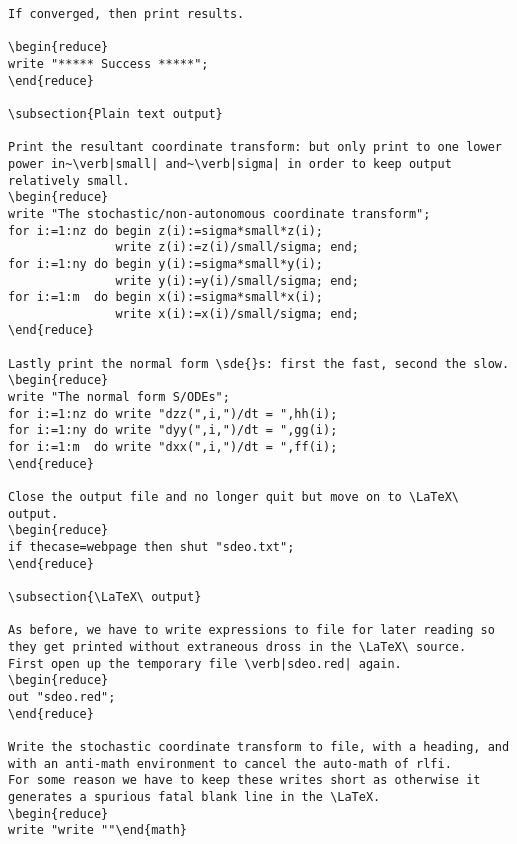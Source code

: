 \documentclass[11pt,a5paper]{article}
\begin{document}
\begin{reduce}
\begin{verbatim}
If converged, then print results.
 
\begin{reduce}
write "***** Success *****";
\end{reduce}

\subsection{Plain text output}

Print the resultant coordinate transform: but only print to one lower power in~\verb|small| and~\verb|sigma| in order to keep output relatively small.
\begin{reduce}
write "The stochastic/non-autonomous coordinate transform";
for i:=1:nz do begin z(i):=sigma*small*z(i); 
               write z(i):=z(i)/small/sigma; end;
for i:=1:ny do begin y(i):=sigma*small*y(i); 
               write y(i):=y(i)/small/sigma; end;
for i:=1:m  do begin x(i):=sigma*small*x(i); 
               write x(i):=x(i)/small/sigma; end;
\end{reduce}

Lastly print the normal form \sde{}s: first the fast, second the slow.
\begin{reduce}
write "The normal form S/ODEs";
for i:=1:nz do write "dzz(",i,")/dt = ",hh(i);
for i:=1:ny do write "dyy(",i,")/dt = ",gg(i);
for i:=1:m  do write "dxx(",i,")/dt = ",ff(i);
\end{reduce}

Close the output file and no longer quit but move on to \LaTeX\ output.
\begin{reduce}
if thecase=webpage then shut "sdeo.txt"; 
\end{reduce}

\subsection{\LaTeX\ output}

As before, we have to write expressions to file for later reading so they get printed without extraneous dross in the \LaTeX\ source.
First open up the temporary file \verb|sdeo.red| again.
\begin{reduce}
out "sdeo.red";
\end{reduce}

Write the stochastic coordinate transform to file, with a heading, and with an anti-math environment to cancel the auto-math of rlfi.
For some reason we have to keep these writes short as otherwise it generates a spurious fatal blank line in the \LaTeX.
\begin{reduce}
write "write ""\end{math}

\end{verbatim}
\end{reduce}
\end{document}
